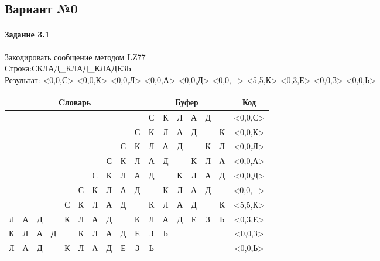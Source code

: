 \documentclass[a4paper, 12pt]{article}
\begin{document}
\pagebreak
\subsection{Вариант №0}
\paragraph{Задание 3.1}

Закодировать сообщение методом LZ77\\
Строка:СКЛАД\_КЛАД\_КЛАДЕЗЬ\\
Результат: <0,0,С> <0,0,К> <0,0,Л> <0,0,А> <0,0,Д> <0,0,\_> <5,5,К> <0,3,Е> <0,0,З> <0,0,Ь>\\
\begin{table}[h!]
\centering
\begin{tabular}{|c|c|c|c|c|c|c|c|c|c|c|c|c|c|c|c|c|} 
\hline
\multicolumn{10}{|c|}{Cловарь} & \multicolumn{6}{c|}{Буфер} & Код  \\ \hline
  &   &   &   &   &   &   &   &   &   & \cellcolor[HTML]{8CE4F6} С & К & Л & А & Д &   & <0,0,С>
\\ \hline
  &   &   &   &   &   &   &   &   & С & \cellcolor[HTML]{8CE4F6} К & Л & А & Д &   & К & <0,0,К>
\\ \hline
  &   &   &   &   &   &   &   & С & К & \cellcolor[HTML]{8CE4F6} Л & А & Д &   & К & Л & <0,0,Л>
\\ \hline
  &   &   &   &   &   &   & С & К & Л & \cellcolor[HTML]{8CE4F6} А & Д &   & К & Л & А & <0,0,А>
\\ \hline
  &   &   &   &   &   & С & К & Л & А & \cellcolor[HTML]{8CE4F6} Д &   & К & Л & А & Д & <0,0,Д>
\\ \hline
  &   &   &   &   & С & К & Л & А & Д & \cellcolor[HTML]{8CE4F6}   & К & Л & А & Д &   & <0,0,\_>
\\ \hline
  &   &   &   & С & \cellcolor[HTML]{FFFF00} К & \cellcolor[HTML]{FFFF00} Л & \cellcolor[HTML]{FFFF00} А & \cellcolor[HTML]{FFFF00} Д & \cellcolor[HTML]{FFFF00}   & \cellcolor[HTML]{FFFF00} К & \cellcolor[HTML]{FFFF00} Л & \cellcolor[HTML]{FFFF00} А & \cellcolor[HTML]{FFFF00} Д & \cellcolor[HTML]{FFFF00}   & \cellcolor[HTML]{8CE4F6} К & <5,5,К>
\\ \hline
\cellcolor[HTML]{FFFF00} Л & \cellcolor[HTML]{FFFF00} А & \cellcolor[HTML]{FFFF00} Д &   & К & Л & А & Д &   & К & \cellcolor[HTML]{FFFF00} Л & \cellcolor[HTML]{FFFF00} А & \cellcolor[HTML]{FFFF00} Д & \cellcolor[HTML]{8CE4F6} Е & З & Ь & <0,3,Е>
\\ \hline
К & Л & А & Д &   & К & Л & А & Д & Е & \cellcolor[HTML]{8CE4F6} З & Ь &   &   &   &   & <0,0,З>
\\ \hline
Л & А & Д &   & К & Л & А & Д & Е & З & \cellcolor[HTML]{8CE4F6} Ь &   &   &   &   &   & <0,0,Ь>
\\ \hline
\end{tabular}
\end{table}

\pagebreak
\end{document}
